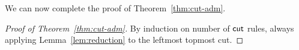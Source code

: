                 We can now complete the proof of Theorem~\ref{thm:cut-adm}.
\begin{proof}[Proof of Theorem~\ref{thm:cut-adm}]
			By induction on number of $\mathsf{cut}$ rules, always applying Lemma~\ref{lem:reduction} to the leftmost topmost cut.
\end{proof}

%
%
%	
%	

